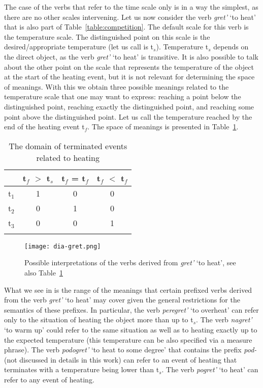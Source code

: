 The case of the verbs that refer to the time scale only is in a way the simplest, as there are no other scales intervening. Let us now consider the verb \textit{gret'} `to heat' that is also part of Table~\ref{table:competition}. The default scale for this verb is the temperature scale. The distinguished point on this scale is the desired/appropriate temperature (let us call is t$_s$). Temperature t$_s$ depends on the direct object, as the verb \textit{gret'} `to heat' is transitive. It is also possible to talk about the other point on the scale that represents the temperature of the object at the start of the heating event, but it is not relevant for determining the space of meanings. With this we obtain three possible meanings related to the temperature scale that one may want to express: reaching a point below the distinguished point, reaching exactly the distinguished point, and reaching some point above the distinguished point. Let us call the temperature reached by the end of the heating event t$_f$. The space of meanings is presented in Table~\ref{table:gret}.

\begin{table}
\caption{The domain of terminated events related to heating \label{table:gret}}
\begin{tabular}{lccc}
\lsptoprule
 & t$_f$ $>$ t$_s$ & t$_f$ = t$_f$ & t$_f$ $<$ t$_f$\\
\midrule
t$_1$ & 1 & 0 & 0\\
t$_2$ & 0 & 1 & 0\\
t$_3$ & 0 & 0 & 1\\
\lspbottomrule
\end{tabular}
\end{table}

\begin{figure}
\centering
\texttt{[image: dia-gret.png]}
\caption{Possible interpretations of the verbs derived from \textit{gret'} `to heat', see also Table~\ref{table:gret} \label{fig:gret}}
\end{figure}

What we see in  is the range of the meanings that certain prefixed verbs derived from the verb \textit{gret'} `to heat' may cover given the general restrictions for the semantics of these prefixes. In particular, the verb \textit{peregret'} `to overheat' can refer only to the situation of heating the object more than up to t$_s$. The verb \textit{nagret'} `to warm up' could refer to the same situation as well as to heating exactly up to the expected temperature (this temperature can be also specified via a measure phrase). The verb \textit{podogret'} `to heat to some degree' that contains the prefix \textit{pod-}     (not discussed in details in this work) can refer to an event of heating that terminates with a temperature being lower than t$_s$. The verb \textit{pogret'} `to heat' can refer to any event of heating.

